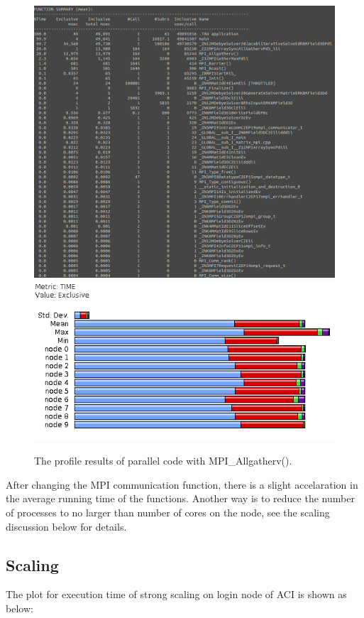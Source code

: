 \documentclass{article}
\begin{document}
\begin{spacing}{1.1}
\begin{figure}[H]
  \centering
  \includegraphics[width=\linewidth]{output/mpi-gather-text.png}
  \includegraphics[width=0.6\linewidth]{output/mpi-gather.png}
  \caption{The profile results of parallel code with MPI\_Allgatherv().}
  \label{fig-testcase}
\end{figure}

After changing the MPI communication function, there is a slight accelaration in the average running time of the functions. Another way is to reduce the number of processes to no larger than number of cores on the node, see the scaling discussion below for details.

\subsection{Scaling}

The plot for execution time of strong scaling on login node of ACI is shown as below:


\end{spacing}
\end{document}
